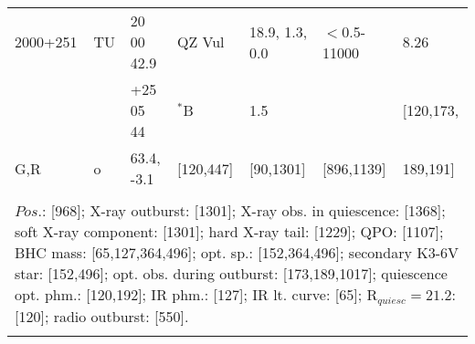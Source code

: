 \documentclass{aa}
\begin{document}
\begin{tabular}{p{2.5cm}p{1cm}p{1.8cm}p{2.3cm}p{3.3cm}p{2.0cm}p{2.2cm}}
\noalign{\smallskip}
2000+251        & TU          & 20 00 42.9            & QZ Vul           & 18.9, 1.3, 0.0       & $<$0.5-11000      & 8.26              \\
                          &                 & +25 05 44             & $^*$B             & 1.5                        &                                & [120,173,    \\
G,R                   & o             & 63.4, -3.1              & [120,447]        & [90,1301]            & [896,1139]            & 189,191]     \\
\\
\multicolumn{7}{p{17.5cm}}{
$Pos$.: [968]; X-ray outburst: [1301]; X-ray obs. in quiescence: [1368]; soft X-ray component: [1301]; 
hard X-ray tail: [1229]; QPO: [1107]; BHC mass: [65,127,364,496]; opt. sp.: [152,364,496]; secondary K3-6V star: 
[152,496]; opt. obs. during outburst: [173,189,1017]; quiescence opt. phm.: [120,192]; IR phm.: [127]; 
IR lt. curve: [65]; R$_{quiesc} = 21.2$: [120]; radio outburst: [550].}\\
\noalign{\smallskip}
\hline

\end{tabular}
\end{document}

